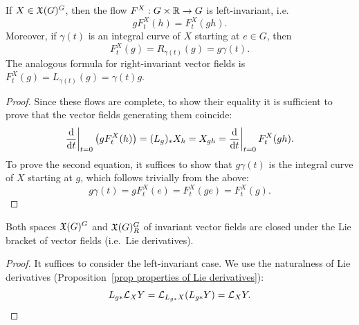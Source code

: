 \begin{lem}\label{lem 471841}
    If $X\in\mathfrak{X}(G)^G$, then the flow $F^X:G\times \mathbb{R} \to G$ is left-invariant, i.e.
    \[gF^X_t(h)=F^X_t(gh).\]
    Moreover, if $\gamma(t)$ is an integral curve of $X$ starting at $e\in G$, then
    \[F^X_t(g)=R_{\gamma(t)}(g)=g\gamma(t).\]
    The analogous formula for right-invariant vector fields is $F^X_t(g)=L_{\gamma(t)}(g)=\gamma(t)g$.
\end{lem}
\begin{proof}
    Since these flows are complete, to show their equality it is sufficient to prove that the vector fields generating them coincide:
    \[\restr{\frac{\dd}{\dd t}}{t=0}\left(gF^X_t(h)\right)=(L_g)_{\ast}X_{h}=X_{gh}=\restr{\frac{\dd}{\dd t}}{t=0} F^X_t(gh).\]
    To prove the second equation, it suffices to show that $g\gamma(t)$ is the integral curve of $X$ starting at $g$, which follows trivially from the above:
    \[g\gamma(t)=g F^X_t(e)=F^X_t(ge)=F^X_t(g).\]
\end{proof}


\begin{lem}
    Both spaces $\mathfrak{X}(G)^G$ and $\mathfrak{X}(G)^G_R$ of invariant vector fields are closed under the Lie bracket of vector fields (i.e.~Lie derivatives).
\end{lem}
\begin{proof}
    It suffices to consider the left-invariant case. We use the naturalness of Lie derivatives (Proposition~\ref{prop properties of Lie derivatives}):
    \[L_{g\ast} \mathcal{L}_X Y=\mathcal{L}_{L_{g\ast}X}(L_{g\ast} Y)=\mathcal{L}_X Y.\]
\end{proof}


